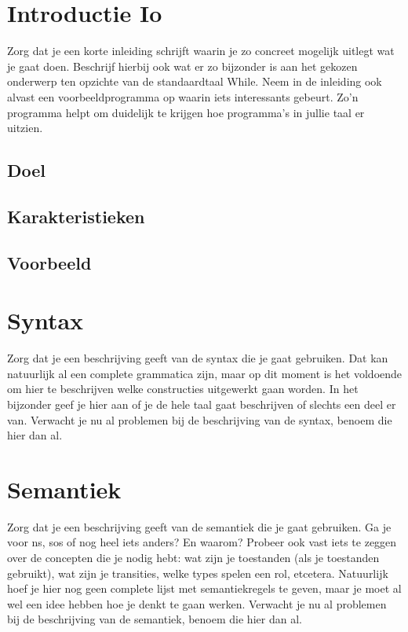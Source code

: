 \documentclass[12pt]{article}
\begin{document}
\maketitle

\begin{abstract}
\end{abstract}

\section{Introductie Io}
Zorg dat je een korte inleiding schrijft waarin je zo concreet mogelijk uitlegt wat je gaat doen. Beschrijf hierbij ook wat er zo bijzonder is aan het gekozen onderwerp ten opzichte van de standaardtaal While. Neem in de inleiding ook alvast een voorbeeldprogramma op waarin iets interessants gebeurt. Zo'n programma helpt om duidelijk te krijgen hoe programma's in jullie taal er uitzien.
\subsection{Doel}
\subsection{Karakteristieken}
\subsection{Voorbeeld}

\section{Syntax}
Zorg dat je een beschrijving geeft van de syntax die je gaat gebruiken. Dat kan natuurlijk al een complete grammatica zijn, maar op dit moment is het voldoende om hier te beschrijven welke constructies uitgewerkt gaan worden. In het bijzonder geef je hier aan of je de hele taal gaat beschrijven of slechts een deel er van. Verwacht je nu al problemen bij de beschrijving van de syntax, benoem die hier dan al.

\section{Semantiek}
Zorg dat je een beschrijving geeft van de semantiek die je gaat gebruiken. Ga je voor ns, sos of nog heel iets anders? En waarom? Probeer ook vast iets te zeggen over de concepten die je nodig hebt: wat zijn je toestanden (als je toestanden gebruikt), wat zijn je transities, welke types spelen een rol, etcetera. Natuurlijk hoef je hier nog geen complete lijst met semantiekregels te geven, maar je moet al wel een idee hebben hoe je denkt te gaan werken. Verwacht je nu al problemen bij de beschrijving van de semantiek, benoem die hier dan al.
\end{document}

